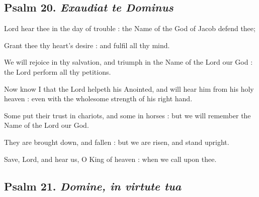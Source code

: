 \subsection{Psalm 20. \textit{Exaudiat te Dominus}}

 Lord hear thee in the day of trouble : the Name of the God of Jacob defend thee;\par
{}
Grant thee thy heart's desire : and fulfil all thy mind.\par
{}We will rejoice in thy salvation, and triumph in the Name of the Lord our God : the Lord perform all thy petitions.\par
{}Now know I that the Lord helpeth his Anointed, and will hear him from his holy heaven : even with the wholesome strength of his right hand.\par
{}Some put their trust in chariots, and some in horses : but we will remember the Name of the Lord our God.\par
{}They are brought down, and fallen : but we are risen, and stand upright.\par
{}Save, Lord, and hear us, O King of heaven : when we call upon thee.\par

\subsection{Psalm 21. \textit{Domine, in virtute tua}}

